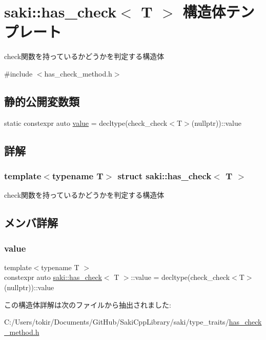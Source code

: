 \hypertarget{structsaki_1_1has__check}{}\section{saki\+:\+:has\+\_\+check$<$ T $>$ 構造体テンプレート}
\label{structsaki_1_1has__check}


check関数を持っているかどうかを判定する構造体  




{\ttfamily \#include $<$has\+\_\+check\+\_\+method.\+h$>$}

\subsection*{静的公開変数類}
\begin{DoxyCompactItemize}
\item 
static constexpr auto \mbox{\hyperlink{structsaki_1_1has__check_aaf5325bde7c74e8afe2a69f8d657d62b}{value}} = decltype(check\+\_\+check$<$T$>$(nullptr))\+::value
\end{DoxyCompactItemize}


\subsection{詳解}
\subsubsection*{template$<$typename T$>$\newline
struct saki\+::has\+\_\+check$<$ T $>$}

check関数を持っているかどうかを判定する構造体 

\subsection{メンバ詳解}
\mbox{\label{structsaki_1_1has__check_aaf5325bde7c74e8afe2a69f8d657d62b}} 
\subsubsection{\texorpdfstring{value}{value}}
{\footnotesize\ttfamily template$<$typename T $>$ \\
constexpr auto \mbox{\hyperlink{structsaki_1_1has__check}{saki\+::has\+\_\+check}}$<$ T $>$\+::value = decltype(check\+\_\+check$<$T$>$(nullptr))\+::value\hspace{0.3cm}{\ttfamily [static]}}



この構造体詳解は次のファイルから抽出されました\+:\begin{DoxyCompactItemize}
\item 
C\+:/\+Users/tokir/\+Documents/\+Git\+Hub/\+Saki\+Cpp\+Library/saki/type\+\_\+traits/\mbox{\hyperlink{has__check__method_8h}{has\+\_\+check\+\_\+method.\+h}}\end{DoxyCompactItemize}
